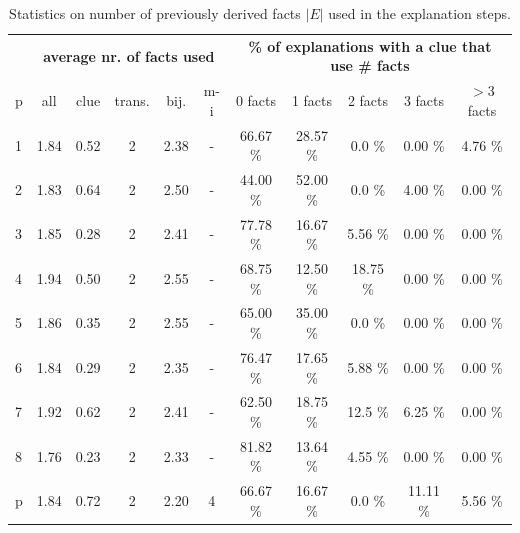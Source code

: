 \begin{table}[t]
	\centering
	\begin{tabular}{l|c|cccc|ccccc}
		  & \multicolumn{5}{c|}{\bf average nr. of facts used} & \multicolumn{5}{c}{\bf \% of explanations with a clue that use \# facts}                                                                                \\
		p & all                                 & clue                                               & trans. & bij. & m-i & 0 facts  & 1 facts  & 2 facts  & 3 facts  & $>$3 facts \\
		\hline
		1 & 1.84                                & 0.52                                                & 2      & 2.38 & -   & 66.67 \% & 28.57 \% & 0.0 \%   & 0.00 \%  & 4.76 \%    \\
		2 & 1.83                                & 0.64                                                & 2      & 2.50 & -   & 44.00 \% & 52.00 \% & 0.0 \%   & 4.00 \%  & 0.00 \%    \\
		3 & 1.85                                & 0.28                                                & 2      & 2.41 & -   & 77.78 \% & 16.67 \% & 5.56 \%  & 0.00 \%  & 0.00 \%    \\
		4 & 1.94                                & 0.50                                                & 2      & 2.55 & -   & 68.75 \% & 12.50 \% & 18.75 \% & 0.00 \%  & 0.00 \%    \\
		5 & 1.86                                & 0.35                                                & 2      & 2.55 & -   & 65.00 \% & 35.00 \% & 0.0 \%   & 0.00 \%  & 0.00 \%    \\
		6 & 1.84                                & 0.29                                                & 2      & 2.35 & -   & 76.47 \% & 17.65 \% & 5.88 \%  & 0.00 \%  & 0.00 \%    \\
		7 & 1.92                                & 0.62                                                & 2      & 2.41 & -   & 62.50 \% & 18.75 \% & 12.5 \%  & 6.25 \%  & 0.00 \%    \\
		8 & 1.76                                & 0.23                                                & 2      & 2.33 & -   & 81.82 \% & 13.64 \% & 4.55 \%  & 0.00 \%  & 0.00 \%    \\
		p & 1.84                                & 0.72                                                & 2      & 2.20 & 4   & 66.67 \% & 16.67 \% & 0.0 \%   & 11.11 \% & 5.56 \%    \\
	\end{tabular}
	\caption{Statistics on number of previously derived facts $|E|$ used in the explanation steps.}
 	\label{table:sequence_leve}
\end{table}
